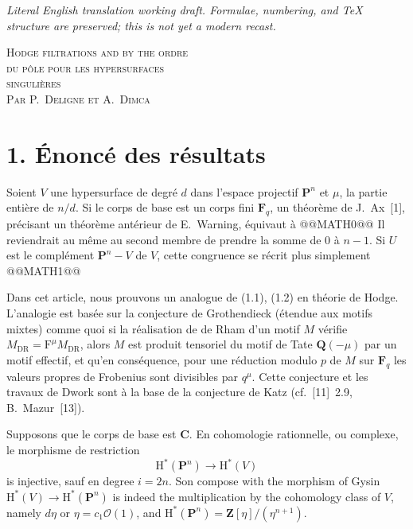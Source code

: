 \documentclass[12pt,a4paper]{article}
\theoremstyle{plain}
\theoremstyle{definition}
\begin{document}
\begin{center}\small\emph{Literal English translation working draft. Formulae, numbering, and TeX structure are preserved; this is not yet a modern recast.}\end{center}
\vspace{0.5em}


\begin{center}
{\Large\scshape Hodge filtrations and by the ordre}\\[4pt]
{\Large\scshape du pôle pour les hypersurfaces}\\[4pt]
{\Large\scshape singulières}\\[12pt]
{\scshape Par P.\ Deligne et A.\ Dimca}
\end{center}

\section*{1. Énoncé des résultats}

Soient $V$ une hypersurface de degré $d$ dans l'espace projectif $\mathbf{P}^n$ et $\mu$, la partie entière de $n/d$. Si le corps de base est un corps fini $\mathbf{F}_q$, un théorème de J.\ Ax~[1], précisant un théorème antérieur de E.\ Warning, équivaut à
@@MATH0@@
Il reviendrait au même au second membre de prendre la somme de $0$ à $n-1$. Si $U$ est le complément $\mathbf{P}^n - V$ de $V$, cette congruence se récrit plus simplement
@@MATH1@@

Dans cet article, nous prouvons un analogue de (1.1), (1.2) en théorie de Hodge. L'analogie est basée sur la conjecture de Grothendieck (étendue aux motifs mixtes) comme quoi si la réalisation de de Rham d'un motif $M$ vérifie $M_{\mathrm{DR}} = \mathrm{F}^\mu M_{\mathrm{DR}}$, alors $M$ est produit tensoriel du motif de Tate $\mathbf{Q}(-\mu)$ par un motif effectif, et qu'en conséquence, pour une réduction modulo $p$ de $M$ sur $\mathbf{F}_q$ les valeurs propres de Frobenius sont divisibles par $q^\mu$. Cette conjecture et les travaux de Dwork sont à la base de la conjecture de Katz (cf.~[11]~2.9, B.~Mazur~[13]).

Supposons que le corps de base est $\mathbf{C}$. En cohomologie rationnelle, ou complexe, le morphisme de restriction
\[
\mathrm{H}^*(\mathbf{P}^n) \to \mathrm{H}^*(V)
\]
is injective, sauf en degree $i = 2n$. Son compose with the morphism of Gysin $\mathrm{H}^*(V) \to \mathrm{H}^*(\mathbf{P}^n)$ is indeed the multiplication by the cohomology class of $V$, namely $d\eta$ or $\eta = c_1 \mathscr{O}(1)$, and $\mathrm{H}^*(\mathbf{P}^n) = \mathbf{Z}[\eta]/(\eta^{n+1})$.
\end{document}
